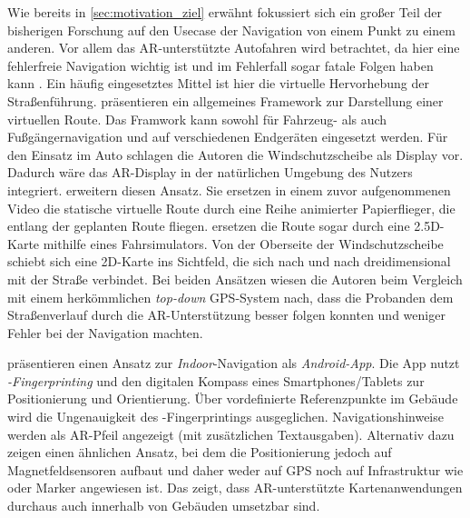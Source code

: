 Wie bereits in \autoref{sec:motivation_ziel} erwähnt fokussiert sich ein großer Teil der bisherigen Forschung auf den Usecase der Navigation von einem Punkt zu einem anderen.
Vor allem das AR-unterstützte Autofahren wird betrachtet, da hier eine fehlerfreie Navigation wichtig ist und im Fehlerfall sogar fatale Folgen haben kann \parencite{Lin2017}.
Ein häufig eingesetztes Mittel ist hier die virtuelle Hervorhebung der Straßenführung.
\textcite{Narzt2006} präsentieren ein allgemeines Framework zur Darstellung einer virtuellen Route.
Das Framwork kann sowohl für Fahrzeug- als auch Fußgängernavigation und auf verschiedenen Endgeräten eingesetzt werden.
Für den Einsatz im Auto schlagen die Autoren die Windschutzscheibe als Display vor.
Dadurch wäre das AR-Display in der natürlichen Umgebung des Nutzers integriert.
\textcite{Bark2014} erweitern diesen Ansatz.
Sie ersetzen in einem zuvor aufgenommenen Video die statische virtuelle Route durch eine Reihe animierter Papierflieger, die entlang der geplanten Route fliegen.
\textcite{Kim2009} ersetzen die Route sogar durch eine 2.5D-Karte mithilfe eines Fahrsimulators.
Von der Oberseite der Windschutzscheibe schiebt sich eine 2D-Karte ins Sichtfeld, die sich nach und nach dreidimensional mit der Straße verbindet.
Bei beiden Ansätzen wiesen die Autoren beim Vergleich mit einem herkömmlichen \emph{top-down} GPS-System nach, dass die Probanden dem Straßenverlauf durch die AR-Unterstützung besser folgen konnten und weniger Fehler bei der Navigation machten.

\textcite{Alnabhan2014} präsentieren einen Ansatz zur \emph{Indoor}-Navigation als \emph{Android-App}.
Die App nutzt \emph{\wifi-Fingerprinting} und den digitalen Kompass eines Smartphones/Tablets zur Positionierung und Orientierung.
Über vordefinierte Referenzpunkte im Gebäude wird die Ungenauigkeit des \wifi-Fingerprintings ausgeglichen.
Navigationshinweise werden als AR-Pfeil angezeigt (mit zusätzlichen Textausgaben).
Alternativ dazu zeigen \textcite{Liu2016} einen ähnlichen Ansatz, bei dem die Positionierung jedoch auf Magnetfeldsensoren aufbaut und daher weder auf GPS noch auf Infrastruktur wie \wifi oder Marker angewiesen ist.
Das zeigt, dass AR-unterstützte Kartenanwendungen durchaus auch innerhalb von Gebäuden umsetzbar sind.

